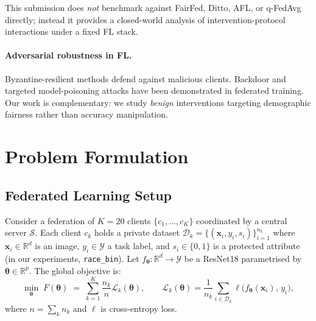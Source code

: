 ﻿\documentclass{article}
\newcommand{\calD}{\mathcal{D}}
\newcommand{\calL}{\mathcal{L}}
\newcommand{\RR}{\mathbb{R}}
\newcommand{\Nclients}{K}                %
\newcommand{\params}{\boldsymbol{\theta}}%
\begin{document}
This submission does \emph{not} benchmark against FairFed, Ditto,
AFL, or q-FedAvg directly; instead it provides a closed-world analysis
of intervention-protocol interactions under a fixed FL stack.

\paragraph{Adversarial robustness in FL.}
Byzantine-resilient methods defend against malicious clients.
Backdoor and targeted model-poisoning attacks have been demonstrated in
federated training.
Our work is complementary: we study \emph{benign}
interventions targeting demographic fairness rather than accuracy
manipulation.

\section{Problem Formulation}
\label{sec:problem}

\subsection{Federated Learning Setup}

Consider a federation of $\Nclients{=}20$ clients
$\{c_1, \ldots, c_K\}$ coordinated by a central server $\mathcal{S}$.
Each client $c_k$ holds a private dataset
$\calD_k = \{(\mathbf{x}_i, y_i, s_i)\}_{i=1}^{n_k}$
where $\mathbf{x}_i \in \RR^d$ is an image, $y_i \in \mathcal{Y}$
a task label, and $s_i \in \{0,1\}$ is a protected
attribute (in our experiments, \texttt{race\_bin}).
Let $f_{\params}: \RR^d \to \mathcal{Y}$ be a ResNet18 parametrised
by $\params \in \RR^p$.
The global objective is:
\begin{equation}
  \min_{\params} \;
  F(\params) \;=\; \sum_{k=1}^{K} \frac{n_k}{n} \calL_k(\params),
  \qquad
  \calL_k(\params) = \frac{1}{n_k}\sum_{i \in \calD_k}
    \ell\bigl(f_{\params}(\mathbf{x}_i),\, y_i\bigr),
  \label{eq:global_obj}
\end{equation}
where $n = \sum_k n_k$ and $\ell$ is cross-entropy loss.
\end{document}
